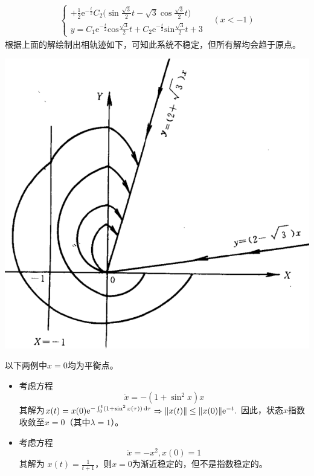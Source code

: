\begin{example}[稳定与不稳定的图示]
\begin{itemize}[leftmargin=1em]
\begin{align*}
\begin{cases}
        +\frac12\mathrm{e}^{-\frac t2} C_2\Big(\sin\frac{\sqrt{3}}2t-\sqrt{3}\cos\frac{\sqrt{3}}2t\Big) \\
        y=C_{1}\mathrm{e}^{-\frac{t}{2}}\mathrm{cos}\frac{\sqrt{3}}{2}t+C_{2}\mathrm{e}^{-\frac{t}{2}}\mathrm{sin}\frac{\sqrt{3}}{2}t+3 \end{cases}&(x<-1)
    \end{align*}
    根据上面的解绘制出相轨迹如下，可知此系统不稳定，但所有解均会趋于原点。
    \begin{center}
      \includegraphics[width=0.4\linewidth]{figure/nonlinear/unstable2.png}
    \end{center}
  \end{itemize}
\end{example}

\begin{example}[稳定与不稳定的计算例]
  以下两例中$x=0$均为平衡点。\begin{itemize}[leftmargin=1em]
    \item 考虑方程$$\dot{x}=-(1+\sin^2x)x$$
其解为$x(t)=x(0)\mathrm{e}^{-\int_{0}^{t}(1+\sin^{2}x(\tau))\mathop{}\!\mathrm{d}\tau}\Rightarrow\|x(t)\|\leq\|x(0)\|\mathrm{e}^{-t}.$
因此，状态$x$指数收敛至$x=0$（其中$\lambda=1$）。
\item 考虑方程$$\dot{x}=-x^2,x(0)=1$$
其解为 $x(t)=\frac1{t+1}$，则$x=0$为渐近稳定的，但不是指数稳定的。
  \end{itemize}
\end{example}
